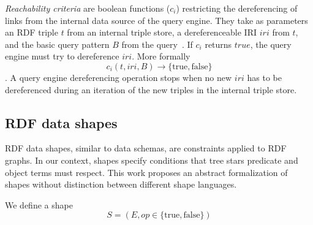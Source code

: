 \emph{Reachability criteria} are boolean functions ($c_i$) restricting the dereferencing of links from the internal data source of the query engine.
They take as parameters an RDF triple $t$ from an internal triple store, a dereferenceable IRI $iri$ from $t$, and the basic query pattern $B$ from the query~\cite{Hartig2012}.
If $c_i$ returns $true$, the query engine must try to dereference $iri$.
More formally
\begin{equation}\label{eq:reachabilityCriteria}
c_i(t, iri, B) \rightarrow \{\mathrm{true}, \mathrm{false}\}
\end{equation}
.
A query engine dereferencing operation stops when no new $iri$ has to be dereferenced during an iteration of the new triples in the internal triple store.

\subsection{RDF data shapes}
RDF data shapes, similar to data schemas, are constraints applied to RDF graphs.
In our context, shapes specify conditions that tree stars predicate and object terms must respect.
This work proposes an abstract formalization of shapes without distinction between different shape languages.

We define a shape
\begin{equation}
S = (E, op \in \{\mathrm{true},\mathrm{false}\})
\end{equation}

